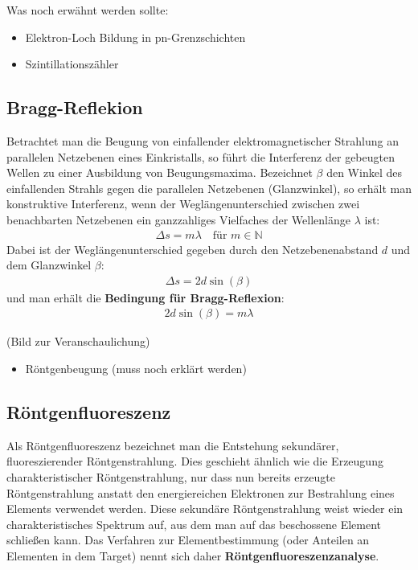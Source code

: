 \documentclass[10pt, a4paper]{article}
\begin{document}
Was noch erwähnt werden sollte:
\begin{itemize}
  \item Elektron-Loch Bildung in pn-Grenzschichten
  \item Szintillationszähler
\end{itemize}

\subsection{Bragg-Reflekion}
Betrachtet man die Beugung von einfallender elektromagnetischer Strahlung an parallelen Netzebenen eines Einkristalls, so führt die Interferenz der gebeugten Wellen zu einer Ausbildung von Beugungsmaxima.
Bezeichnet $\beta$ den Winkel des einfallenden Strahls gegen die parallelen Netzebenen (Glanzwinkel), so erhält man konstruktive Interferenz, wenn der Weglängenunterschied zwischen zwei benachbarten Netzebenen ein ganzzahliges Vielfaches der Wellenlänge $\lambda$ ist:
\begin{align}
  \Delta s = m \lambda \quad \text{für } m \in \mathbb{N}
\end{align}
Dabei ist der Weglängenunterschied gegeben durch den Netzebenenabstand $d$ und dem Glanzwinkel $\beta$:
\begin{align}
  \Delta s = 2 d \sin(\beta)
\end{align}
und man erhält die \textbf{Bedingung für Bragg-Reflexion}:
\begin{align}
  2 d \sin(\beta) = m \lambda
  \label{eq:bragg}
\end{align}

(Bild zur Veranschaulichung)

\begin{itemize}
  \item Röntgenbeugung (muss noch erklärt werden)
\end{itemize}

\subsection{Röntgenfluoreszenz}
Als Röntgenfluoreszenz bezeichnet man die Entstehung sekundärer, fluoreszierender Röntgenstrahlung.
Dies geschieht ähnlich wie die Erzeugung charakteristischer Röntgenstrahlung, nur dass nun bereits erzeugte Röntgenstrahlung anstatt den energiereichen Elektronen zur Bestrahlung eines Elements verwendet werden.
Diese sekundäre Röntgenstrahlung weist wieder ein charakteristisches Spektrum auf, aus dem man auf das beschossene Element schließen kann.
Das Verfahren zur Elementbestimmung (oder Anteilen an Elementen in dem Target) nennt sich daher \textbf{Röntgenfluoreszenzanalyse}.
\end{document}
